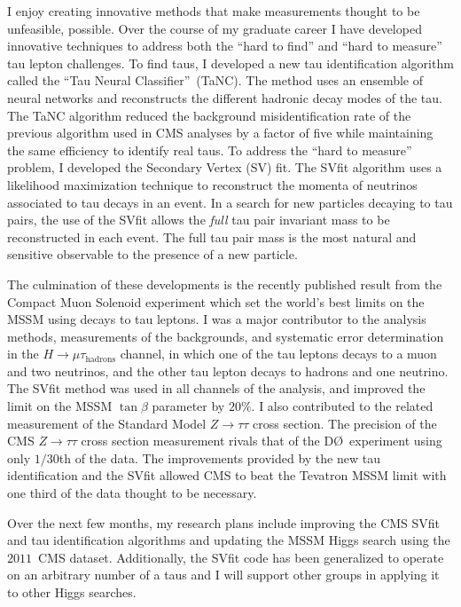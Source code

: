 \documentclass{scrartcl}        %
\begin{document}
\begin{cv}{}
I enjoy creating innovative methods that make measurements thought to be
unfeasible, possible.  Over the course of my graduate career I have developed
innovative techniques to address both the ``hard to find'' and ``hard to
measure'' tau lepton challenges.  To find taus, I developed a new tau
identification algorithm called the ``Tau Neural Classifier''~(TaNC).  The
method uses an ensemble of neural networks and reconstructs the different
hadronic decay modes of the tau.  The TaNC algorithm reduced the background
misidentification rate of the previous algorithm used in CMS analyses by a
factor of five while maintaining the same efficiency to identify real taus.  To
address the ``hard to measure'' problem, I developed the Secondary Vertex (SV)
fit.  The SVfit algorithm uses a likelihood maximization technique to
reconstruct the momenta of neutrinos associated to tau decays in an event.  In a
search for new particles decaying to tau pairs, the use of the SVfit allows the
\emph{full} tau pair invariant mass to be reconstructed in each event. The full
tau pair mass is the most natural and sensitive observable to the presence of a
new particle.

The culmination of these developments is the recently published result from the
Compact Muon Solenoid experiment which set the world's best limits on the MSSM
using decays to tau leptons.  I was a major contributor to the analysis methods,
measurements of the backgrounds, and systematic error determination in the $H
\to \mu \tau_{\mathrm{hadrons}}$ channel, in which one of the tau leptons decays
to a muon and two neutrinos, and the other tau lepton decays to hadrons and one
neutrino.  The SVfit method was used in all channels of the analysis, and
improved the limit on the MSSM $\tan\beta$ parameter by $20\%$.  I also
contributed to the related measurement of the Standard Model $Z\to\tau\tau$
cross section. The precision of the CMS $Z\to\tau\tau$ cross section measurement
rivals that of the D\O~experiment using only $1/30$th of the data.  The
improvements provided by the new tau identification and the SVfit allowed CMS to
beat the Tevatron MSSM limit with one third of the data thought to be necessary.   

Over the next few months, my research plans include improving the CMS SVfit and
tau identification algorithms and updating the MSSM Higgs search using the
$2011$~CMS dataset.  Additionally, the SVfit code has been generalized to
operate on an arbitrary number of a taus and I will support other groups in
applying it to other Higgs searches.  


\end{cv}
\end{document}
